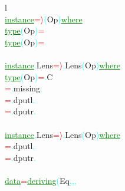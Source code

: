 {\rm{}l}\\\textcolor{green}{\underline{instance}}\hsspace \textcolor{red}{=\ensuremath{\rangle}}\hsspace \textcolor{cyan}{(}{\rm{}Op}\textcolor{cyan}{)}\hsspace \textcolor{green}{\underline{where}}\\\hstab \textcolor{green}{\underline{type}}\hsspace \textcolor{cyan}{(}{\rm{}Op}\textcolor{cyan}{)}\hsspace \textcolor{red}{=}\\\hstab \textcolor{green}{\underline{type}}\hsspace \textcolor{cyan}{(}{\rm{}Op}\textcolor{cyan}{)}\hsspace \textcolor{red}{=}\\\\\textcolor{green}{\underline{instance}}\textcolor{cyan}{.}{\rm{}Lens}\hsspace \textcolor{red}{=\ensuremath{\rangle}}\textcolor{cyan}{.}{\rm{}Lens}\hsspace \textcolor{cyan}{(}{\rm{}Op}\textcolor{cyan}{)}\hsspace \textcolor{green}{\underline{where}}\\\hstab \textcolor{green}{\underline{type}}\hsspace \textcolor{cyan}{(}{\rm{}Op}\textcolor{cyan}{)}\hsspace \textcolor{red}{=}\textcolor{cyan}{.}{\rm{}C}\\\hsspace \textcolor{red}{=}\textcolor{cyan}{.}{\rm{}missing}\hsspace \textcolor{cyan}{.}\\\hsspace \hsspace \hsspace \textcolor{red}{=}\textcolor{cyan}{.}{\rm{}dputl}\hsspace \hsspace \hsspace \textcolor{cyan}{.}\\\hsspace \hsspace \hsspace \textcolor{red}{=}\textcolor{cyan}{.}{\rm{}dputr}\hsspace \hsspace \hsspace \textcolor{cyan}{.}\\\\\textcolor{green}{\underline{instance}}\textcolor{cyan}{.}{\rm{}Lens}\hsspace \textcolor{red}{=\ensuremath{\rangle}}\textcolor{cyan}{.}{\rm{}Lens}\hsspace \textcolor{cyan}{(}{\rm{}Op}\textcolor{cyan}{)}\hsspace \textcolor{green}{\underline{where}}\\\hsspace \textcolor{red}{=}\textcolor{cyan}{.}{\rm{}dputl}\hsspace \textcolor{cyan}{.}\\\hsspace \textcolor{red}{=}\textcolor{cyan}{.}{\rm{}dputr}\hsspace \textcolor{cyan}{.}\\\\\textcolor{green}{\underline{data}}\hsspace \textcolor{red}{=}\hsspace \textcolor{green}{\underline{deriving}}\hsspace \textcolor{cyan}{(}{\rm{}Eq}\textcolor{cyan}{,}\textcolor{cyan}{,}\textcolor{cyan}{,}\hsspace 